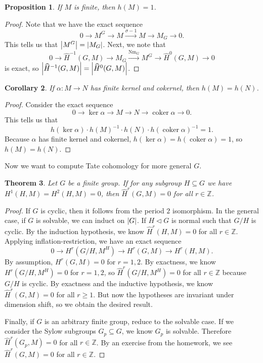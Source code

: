 \documentclass[leqno, openany]{memoir}
\newtheorem{thm}{Theorem}[section]
\newtheorem{cor}[thm]{Corollary}
\newtheorem{prop}[thm]{Proposition}
\theoremstyle{definition}
\theoremstyle{remark}
\theoremstyle{plain}
\theoremstyle{definition}
\theoremstyle{remark}
\newcommand{\Z}{\mathbb{Z}}
\newcommand{\wh}[1]{\widehat{#1}}
\DeclareMathOperator{\Nm}{Nm}
\DeclareMathOperator{\coker}{coker}
\begin{document}
\begin{prop} If $M$ is finite, then $h(M) = 1$.  \end{prop}

\begin{proof} Note that we have the exact sequence \[ 0 \to M^G \to M
    \xrightarrow{\sigma - 1} M \to M_G \to 0. \] This tells us that $\abs{M^G}
    = \abs{M_G}$. Next, we note that \[ 0 \to \wh{H}^{-1}(G, M) \to M_G
    \xrightarrow{\Nm_G} M^G \to \wh{H}^0(G, M) \to 0 \] is exact, so
$\abs{\wh{H}^{-1}(G, M)} = \abs{\wh{H}^0(G, M)}$.  \end{proof}

\begin{cor} If $\alpha \colon M \to N$ has finite kernel and cokernel, then
$h(M) = h(N)$.  \end{cor}

\begin{proof} Consider the exact sequence \[ 0 \to \ker \alpha \to M \to N \to
    \coker \alpha \to 0. \] This tells us that \[ h(\ker \alpha) \cdot { h(M)
}^{-1} \cdot h(N) \cdot { h(\coker \alpha) }^{-1} = 1. \] Because $\alpha$ has
finite kernel and cokernel, $h(\ker \alpha) = h(\coker \alpha) = 1$, so $h(M) =
h(N)$.  \end{proof}

Now we want to compute Tate cohomology for more general $G$.

\begin{thm} Let $G$ be a finite group. If for any subgroup $H \subseteq G$ we
have $H^1(H, M) = H^2(H, M) = 0$, then $\wh{H}^r(G, M) = 0$ for all $r \in \Z$.
\end{thm}

\begin{proof} If $G$ is cyclic, then it follows from the period $2$
    isomorphism. In the general case, if $G$ is solvable, we can induct on
    $\abs{G}$. If $H \triangleleft G$ is normal such that $G/H$ is cyclic. By
    the induction hypothesis, we know $\wh{H}^r(H, M) = 0$ for all $r \in \Z$.
    Applying inflation-restriction, we have an exact sequence \[ 0 \to H^r(G/H,
    M^H) \to H^r(G, M) \to H^r(H, M). \] By assumption, $H^r(G, M) = 0$ for $r
    = 1,2$. By exactness, we know $H^r(G/H, M^H) = 0$ for $r = 1,2$, so
    $\wh{H}^r(G/H, M^H) = 0$ for all $r \in \Z$ because $G/H$ is cyclic. By
    exactness and the inductive hypothesis, we know $\wh{H}^r(G, M) = 0$ for
    all $r \geq 1$. But now the hypotheses are invariant under dimension shift,
    so we obtain the desired result.

    Finally, if $G$ is an arbitrary finite group, reduce to the solvable case.
If we consider the Sylow subgroups $G_p \subseteq G$, we know $G_p$ is
solvable. Therefore $\wh{H}^r(G_p, M) = 0$ for all $r \in \Z$. By an exercise
from the homework, we see $\wh{H}^r(G, M) = 0$ for all $r \in \Z$.  \end{proof}
\end{document}
